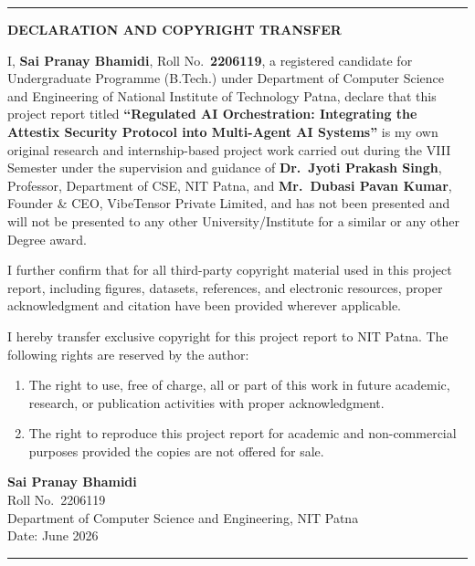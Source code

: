 \pagebreak
{}
\cleardoublepage
{}

\noindent\rule{\linewidth}{2pt}
\begin{center}
{\bf \Large DECLARATION AND COPYRIGHT TRANSFER}\\
\par\vspace{5mm}
\end{center}

\noindent
I, \textbf{Sai Pranay Bhamidi}, Roll No.\ \textbf{2206119}, a registered candidate for Undergraduate Programme (B.Tech.) under Department of Computer Science and Engineering of National Institute of Technology Patna, declare that this project report titled \textbf{``Regulated AI Orchestration: Integrating the Attestix Security Protocol into Multi-Agent AI Systems''} is my own original research and internship-based project work carried out during the VIII Semester under the supervision and guidance of \textbf{Dr.\ Jyoti Prakash Singh}, Professor, Department of CSE, NIT Patna, and \textbf{Mr.\ Dubasi Pavan Kumar}, Founder \& CEO, VibeTensor Private Limited, and has not been presented and will not be presented to any other University/Institute for a similar or any other Degree award.

\vspace{0.8cm}

\noindent
I further confirm that for all third-party copyright material used in this project report, including figures, datasets, references, and electronic resources, proper acknowledgment and citation have been provided wherever applicable.

\vspace{0.8cm}

\noindent
I hereby transfer exclusive copyright for this project report to NIT Patna. The following rights are reserved by the author:

\vspace{0.3cm}

\begin{enumerate}
\item[(a)] The right to use, free of charge, all or part of this work in future academic, research, or publication activities with proper acknowledgment.

\vspace{0.2cm}

\item[(b)] The right to reproduce this project report for academic and non-commercial purposes provided the copies are not offered for sale.
\end{enumerate}

\vspace{1.5cm}

\noindent
\textbf{Sai Pranay Bhamidi}\\[0.1cm]
Roll No.\ 2206119\\[0.1cm]
Department of Computer Science and Engineering, NIT Patna\\[0.1cm]
Date: June 2026

\vfill
\noindent\rule{\linewidth}{2pt}
